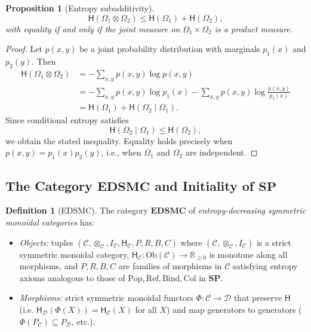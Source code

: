 \documentclass[12pt,a4paper]{article}
\newtheorem{proposition}[theorem]{Proposition}
\theoremstyle{definition}
\newtheorem{definition}[theorem]{Definition}
\theoremstyle{remark}
\newcommand{\Rnn}{\mathbb{R}_{\ge 0}}
\newcommand{\Ent}{\ensuremath{\mathsf{H}}}
\newcommand{\SP}{\mathbf{SP}}
\newcommand{\EDSMC}{\mathbf{EDSMC}}
\newcommand{\Ob}{\mathrm{Ob}}
\newcommand{\Pop}{\ensuremath{\mathrm{Pop}}}
\newcommand{\RefOp}{\ensuremath{\mathrm{Ref}}}
\newcommand{\Bind}{\ensuremath{\mathrm{Bind}}}
\newcommand{\Col}{\ensuremath{\mathrm{Col}}}
\newcommand{\tensor}{\otimes}
\newcommand{\unit}{I}
\begin{document}
\begin{proposition}[Entropy subadditivity]
\label{prop:subadditive}
\[
\Ent(\Omega_1\tensor\Omega_2)
\le
\Ent(\Omega_1)+\Ent(\Omega_2),
\]
with equality if and only if the joint measure on
$\Omega_1\times\Omega_2$ is a product measure.
\end{proposition}

\begin{proof}
Let $p(x,y)$ be a joint probability distribution with marginals
$p_1(x)$ and $p_2(y)$. Then
\begin{align*}
\Ent(\Omega_1\tensor\Omega_2)
&= -\sum_{x,y} p(x,y)\log p(x,y) \\
&= -\sum_{x,y} p(x,y)\log p_1(x)
   -\sum_{x,y} p(x,y)\log\frac{p(x,y)}{p_1(x)} \\
&= \Ent(\Omega_1) + \Ent(\Omega_2\mid\Omega_1).
\end{align*}
Since conditional entropy satisfies
\[
\Ent(\Omega_2\mid\Omega_1)\le \Ent(\Omega_2),
\]
we obtain the stated inequality. Equality holds precisely when
$p(x,y)=p_1(x)p_2(y)$, i.e., when $\Omega_1$ and $\Omega_2$
are independent.
\end{proof}

\subsection{The Category \texorpdfstring{$\EDSMC$}{EDSMC} and Initiality of \texorpdfstring{$\SP$}{SP}}

\begin{definition}[EDSMC]
\label{def:edsmc}
The category $\EDSMC$ of \emph{entropy-decreasing symmetric monoidal categories}
has:
\begin{itemize}
\item \textit{Objects:} tuples $(\mathcal{C},\tensor_\mathcal{C},\unit_\mathcal{C},
  \Ent_\mathcal{C},P,R,B,C)$ where $(\mathcal{C},\tensor_\mathcal{C},\unit_\mathcal{C})$
  is a strict symmetric monoidal category, $\Ent_\mathcal{C}:\Ob(\mathcal{C})\to\Rnn$
  is monotone along all morphisms, and $P,R,B,C$ are families of morphisms in
  $\mathcal{C}$ satisfying entropy axioms analogous to those of
  $\Pop,\RefOp,\Bind,\Col$ in $\SP$.
\item \textit{Morphisms:} strict symmetric monoidal functors
  $\Phi:\mathcal{C}\to\mathcal{D}$ that preserve $\Ent$ (i.e.
  $\Ent_\mathcal{D}(\Phi(X))=\Ent_\mathcal{C}(X)$ for all $X$) and map generators
  to generators ($\Phi(P_\mathcal{C})\subseteq P_\mathcal{D}$, etc.).
\end{itemize}
\end{definition}
\end{document}
